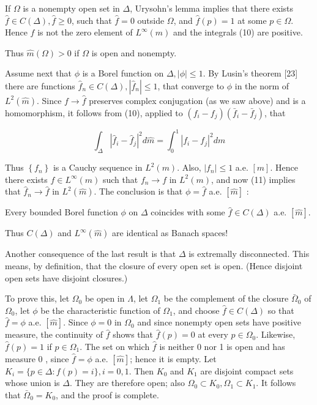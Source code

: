 \documentclass[10pt]{article}
\begin{document}
If $\Omega$ is a nonempty open set in $\Delta$, Urysohn's lemma implies that there exists $\hat{f} \in C(\Delta), \hat{f} \geq 0$, such that $\hat{f}=0$ outside $\Omega$, and $\hat{f}(p)=1$ at some $p \in \Omega$. Hence $f$ is not the zero element of $L^{\infty}(m)$ and the integrals (10) are positive.

Thus $\hat{m}(\Omega)>0$ if $\Omega$ is open and nonempty.

Assume next that $\phi$ is a Borel function on $\Delta,|\phi| \leq 1$. By Lusin's theorem [23] there are functions $\hat{f}_{n} \in C(\Delta),\left|\hat{f}_{n}\right| \leq 1$, that converge to $\phi$ in the norm of $L^{2}(\hat{m})$. Since $f \rightarrow \hat{f}$ preserves complex conjugation (as we saw above) and is a homomorphism, it follows from (10), applied to $\left(f_{i}-f_{j}\right)\left(\bar{f}_{i}-\bar{f}_{j}\right)$, that

$$
\int_{\Delta}\left|\hat{f}_{i}-\hat{f}_{j}\right|^{2} d \hat{m}=\int_{0}^{1}\left|f_{i}-f_{j}\right|^{2} d m
$$

Thus $\left\{f_{n}\right\}$ is a Cauchy sequence in $L^{2}(m)$. Also, $\left|f_{n}\right| \leq 1$ a.e. $[m]$. Hence there exists $f \in L^{\infty}(m)$ such that $f_{n} \rightarrow f$ in $L^{2}(m)$, and now (11) implies that $\hat{f}_{n} \rightarrow \hat{f}$ in $L^{2}(\hat{m})$. The conclusion is that $\phi=\hat{f}$ a.e. $[\hat{m}]$ :

Every bounded Borel function $\phi$ on $\Delta$ coincides with some $\hat{f} \in C(\Delta)$ a.e. $[\hat{m}]$.

Thus $C(\Delta)$ and $L^{\infty}(\hat{m})$ are identical as Banach spaces!

Another consequence of the last result is that $\Delta$ is extremally disconnected. This means, by definition, that the closure of every open set is open. (Hence disjoint open sets have disjoint closures.)

To prove this, let $\Omega_{0}$ be open in $\Lambda$, let $\Omega_{1}$ be the complement of the closure $\bar{\Omega}_{0}$ of $\Omega_{0}$, let $\phi$ be the characteristic function of $\Omega_{1}$, and choose $\hat{f} \in C(\Delta)$ so that $\hat{f}=\phi$ a.e. $[\hat{m}]$. Since $\phi=0$ in $\Omega_{0}$ and since nonempty open sets have positive measure, the continuity of $\hat{f}$ shows that $\hat{f}(p)=0$ at every $p \in \Omega_{0}$. Likewise, $\hat{f}(p)=1$ if $p \in \Omega_{1}$. The set on which $\hat{f}$ is neither 0 nor 1 is open and has measure 0 , since $\hat{f}=\phi$ a.e. $[\hat{m}]$; hence it is empty. Let $K_{i}=\{p \in \Delta: f(p)=i\}, i=0,1$. Then $K_{0}$ and $K_{1}$ are disjoint compact sets whose union is $\Delta$. They are therefore open; also $\Omega_{0} \subset K_{0}, \Omega_{1} \subset K_{1}$. It follows that $\bar{\Omega}_{0}=K_{0}$, and the proof is complete.
\end{document}
